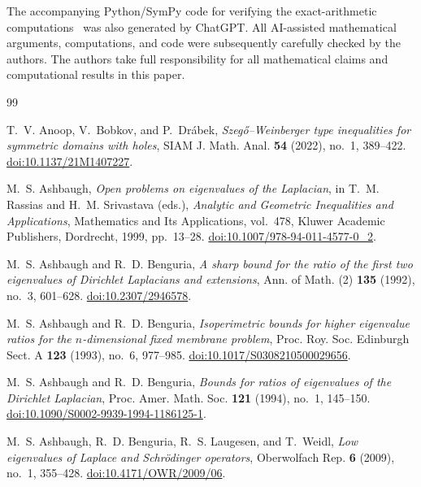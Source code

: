 \documentclass[11pt,letterpaper,reqno]{amsart}
\theoremstyle{definition}
\begin{document}
The accompanying Python/SymPy code for verifying the exact-arithmetic
computations~\cite{ExactArithmeticCode} was also generated by ChatGPT.
All AI-assisted mathematical arguments, computations, and code were
subsequently carefully checked by the authors. The authors take full
responsibility for all mathematical claims and computational results in
this paper.




\begin{thebibliography}{99}

T.~V. Anoop, V.~Bobkov, and P.~Dr\'abek,
\emph{Szeg\H{o}--Weinberger type inequalities for symmetric domains with holes},
SIAM J. Math. Anal. \textbf{54} (2022), no.~1, 389--422.
\href{https://doi.org/10.1137/21M1407227}
{doi:10.1137/21M1407227}.

M.~S. Ashbaugh,
\emph{Open problems on eigenvalues of the Laplacian},
in T.~M. Rassias and H.~M. Srivastava (eds.),
\emph{Analytic and Geometric Inequalities and Applications},
Mathematics and Its Applications, vol.~478,
Kluwer Academic Publishers, Dordrecht, 1999, pp.~13--28.
\href{https://doi.org/10.1007/978-94-011-4577-0_2}{doi:10.1007/978-94-011-4577-0\_2}.

M.~S. Ashbaugh and R.~D. Benguria,
\emph{A sharp bound for the ratio of the first two eigenvalues of Dirichlet
Laplacians and extensions},
Ann. of Math. (2) \textbf{135} (1992), no.~3, 601--628.
\href{https://doi.org/10.2307/2946578}{doi:10.2307/2946578}.

M.~S. Ashbaugh and R.~D. Benguria,
\emph{Isoperimetric bounds for higher eigenvalue ratios for the
$n$-dimensional fixed membrane problem},
Proc. Roy. Soc. Edinburgh Sect. A \textbf{123} (1993), no.~6, 977--985.
\href{https://doi.org/10.1017/S0308210500029656}{doi:10.1017/S0308210500029656}.

M.~S. Ashbaugh and R.~D. Benguria,
\emph{Bounds for ratios of eigenvalues of the Dirichlet Laplacian},
Proc. Amer. Math. Soc. \textbf{121} (1994), no.~1, 145--150.
\href{https://doi.org/10.1090/S0002-9939-1994-1186125-1}{doi:10.1090/S0002-9939-1994-1186125-1}.

M.~S. Ashbaugh, R.~D. Benguria, R.~S. Laugesen, and T.~Weidl,
\emph{Low eigenvalues of Laplace and Schr\"odinger operators},
Oberwolfach Rep. \textbf{6} (2009), no.~1, 355--428.
\href{https://doi.org/10.4171/OWR/2009/06}{doi:10.4171/OWR/2009/06}.


\end{thebibliography}
\end{document}
